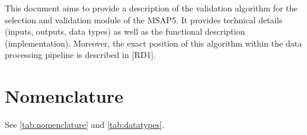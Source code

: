 \documentclass[a4paper, oneside, 11pt, article, english]{memoir}
\begin{document}
This document aims to provide a description of the validation algorithm for the selection and validation module of the MSAP5. 
It provides technical details (inputs, outputs, data types) as well as the
functional description (implementation). 
Moreover, the exact position of this algorithm within the data processing pipeline is described in [RD1]. 


\section{Nomenclature}
\label{sec:nomenclature}


See \ref{tab:nomenclature} and \ref{tab:datatypes}.
\end{document}

